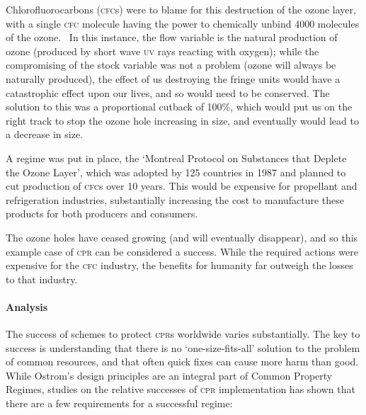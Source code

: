 Chlorofluorocarbons (\textsc{cfc}s) were to blame for this destruction of the ozone layer, with a single \textsc{cfc} molecule having the power to chemically unbind 4000 molecules of the ozone.~\cite{Canada-sea-law} In this instance, the flow variable is the natural production of ozone (produced by short wave \textsc{uv} rays reacting with oxygen); while the compromising of the stock variable was not a problem (ozone will always be naturally produced), the effect of us destroying the fringe units would have a catastrophic effect upon our lives, and so would need to be conserved. The solution to this was a proportional cutback of 100\%, which would put us on the right track to stop the ozone hole increasing in size, and eventually would lead to a decrease in size.

A regime was put in place, the `Montreal Protocol on Substances that Deplete the Ozone Layer', which was adopted by 125 countries in 1987 and planned to cut production of \textsc{cfc}s over 10 years. This would be expensive for propellant and refrigeration industries, substantially increasing the cost to manufacture these products for both producers and consumers.

The ozone holes have ceased growing (and will eventually disappear), and so this example case of \textsc{cpr} can be considered a success. While the required actions were expensive for the \textsc{cfc} industry, the benefits for humanity far outweigh the losses to that industry.

\paragraph{Analysis}

The success of schemes to protect \textsc{cpr}s worldwide varies substantially. The key to success is understanding that there is no `one-size-fits-all' solution to the problem of common resources, and that often quick fixes can cause more harm than good. While Ostrom's design principles are an integral part of Common Property Regimes, studies on the relative successes of \textsc{cpr} implementation has shown that there are a few requirements for a successful regime:~\cite{Ostrom-challenge-90}

